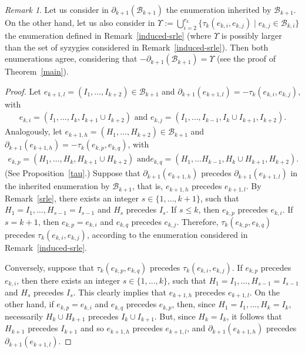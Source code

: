 \documentclass[10pt]{amsart}
\newcommand{\mcb}{\mbox{$\mathcal{B}$}}
\newcommand{\dif}{\mbox{$\partial$}}
\theoremstyle{definition}
\theoremstyle{remark}
\newtheorem{remark}[cdrthm]{Remark}
\begin{document}
\begin{remark}\label{enum}
Let us consider in $\dif_{k+1}(\mcb_{k+1})$ the enumeration inherited
by $\mcb_{k+1}$. On the other hand, let us also consider in
$\Upsilon:=\bigcup_{i=2}^{r_k}\{\tau_{k}(e_{k,i},e_{k,j})\mid
e_{k,j}\in\mcb_{k,i}\}$ the enumeration defined in
Remark~\ref{induced-srle} (where $\Upsilon$ is possibly larger than
the set of syzygies considered in Remark~\ref{induced-srle}). Then
both enumerations agree, considering that
$-\dif_{k+1}(\mcb_{k+1})=\Upsilon$ (see the proof of
Theorem~\ref{main}).
\end{remark}
\begin{proof}
Let $e_{k+1,l}=(I_1,\ldots ,I_{k+2})\in\mcb_{k+1}$ and
$\dif_{k+1}(e_{k+1,l})= -\tau_{k}(e_{k,i},e_{k,j})$, with
\begin{eqnarray*}
e_{k,i}=(I_1,\ldots ,I_{k},I_{k+1}\cup I_{k+2})\mbox{ and }
e_{k,j}=(I_1,\ldots ,I_{k-1},I_k\cup I_{k+1},I_{k+2}).
\end{eqnarray*}
Analogously, let $e_{k+1,h}=(H_1,\ldots ,H_{k+2})\in\mcb_{k+1}$ and
$\dif_{k+1}(e_{k+1,h})=-\tau_{k}(e_{k,p},e_{k,q})$, with
\begin{eqnarray*}
e_{k,p}=(H_1,\ldots ,H_k,H_{k+1}\cup H_{k+2})\mbox{ and
}e_{k,q}=(H_1,\ldots H_{k-1},H_k\cup H_{k+1},H_{k+2}).
\end{eqnarray*}
(See Proposition~\ref{tau}.) Suppose that $\dif_{k+1}(e_{k+1,h})$
precedes $\dif_{k+1}(e_{k+1,l})$ in the inherited enumeration by
$\mcb_{k+1}$, that is, $e_{k+1,h}$ precedes $e_{k+1,l}$. By
Remark~\ref{srle}, there exists an integer $s\in\{1,\ldots ,k+1\}$,
such that $H_1=I_1,\ldots ,H_{s-1}=I_{s-1}$ and $H_s$ precedes
$I_s$. If $s\leq k$, then $e_{k,p}$ precedes $e_{k,i}$. If $s=k+1$,
then $e_{k,p}=e_{k,i}$ and $e_{k,q}$ precedes $e_{k,j}$. Therefore,
$\tau_k(e_{k,p},e_{k,q})$ precedes $\tau_k(e_{k,i},e_{k,j})$,
according to the enumeration considered in Remark~\ref{induced-srle}.

Conversely, suppose that $\tau_k(e_{k,p},e_{k,q})$ precedes
$\tau_k(e_{k,i},e_{k,j})$. If $e_{k,p}$ precedes $e_{k,i}$, then there
exists an integer $s\in\{1,\ldots ,k\}$, such that
$H_1=I_1,\ldots,H_{s-1}=I_{s-1}$ and $H_{s}$ precedes $I_{s}$. This
clearly implies that $e_{k+1,h}$ precedes $e_{k+1,l}$. On the other
hand, if $e_{k,p}=e_{k,i}$ and $e_{k,q}$ precedes $e_{k,p}$, then,
since $H_1=I_1,\ldots,H_{k}=I_{k}$, necessarily $H_k\cup H_{k+1}$
precedes $I_k\cup I_{k+1}$. But, since $H_k=I_k$, it follows that
$H_{k+1}$ precedes $I_{k+1}$ and so $e_{k+1,h}$ precedes $e_{k+1,l}$,
and $\dif_{k+1}(e_{k+1,h})$ precedes $\dif_{k+1}(e_{k+1,l})$.
\end{proof}
\end{document}

